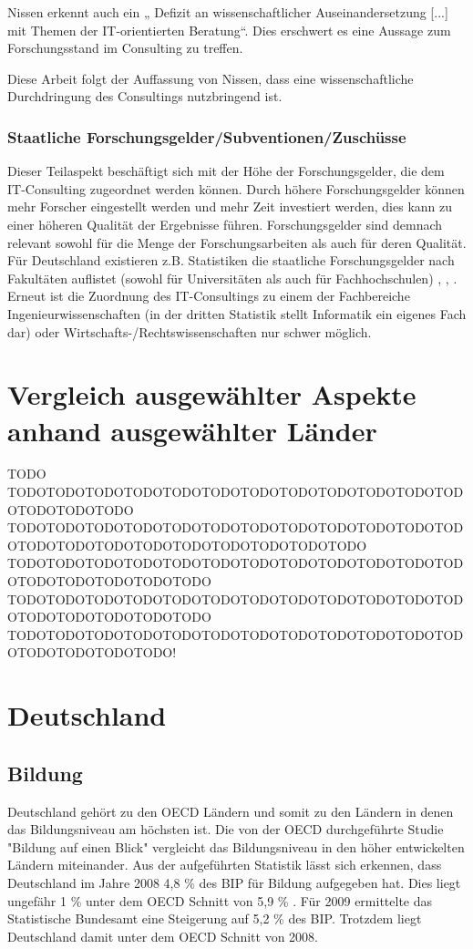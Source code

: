 Nissen erkennt auch ein „ Defizit an wissenschaftlicher Auseinandersetzung [...] mit Themen der IT-orientierten Beratung“. Dies erschwert es eine Aussage zum Forschungsstand im Consulting zu treffen.

Diese Arbeit folgt der Auffassung von Nissen, dass eine wissenschaftliche Durchdringung des Consultings nutzbringend ist.

\subsubsection*{Staatliche Forschungsgelder/Subventionen/Zuschüsse}
Dieser Teilaspekt beschäftigt sich mit der Höhe der Forschungsgelder, die dem IT-Consulting zugeordnet werden können. Durch höhere Forschungsgelder können mehr Forscher eingestellt werden und mehr Zeit investiert werden, dies kann zu einer höheren Qualität der Ergebnisse führen. Forschungsgelder sind demnach relevant sowohl für die Menge der Forschungsarbeiten als auch für deren Qualität.
Für Deutschland existieren z.B. Statistiken die staatliche Forschungsgelder nach Fakultäten auflistet (sowohl für Universitäten als auch für Fachhochschulen) \cite {ausgabenfakuni}, \cite {ausgabenfakfach}, \cite {ausgabenbmbf}. Erneut ist die Zuordnung des IT-Consultings zu einem der Fachbereiche Ingenieurwissenschaften (in der dritten Statistik stellt Informatik ein eigenes Fach dar) oder Wirtschafts-/Rechtswissenschaften nur schwer möglich.



\section{Vergleich ausgewählter Aspekte anhand ausgewählter Länder}
TODO TODOTODOTODOTODOTODOTODOTODOTODOTODOTODOTODOTODOTODOTODOTODO
TODOTODOTODOTODOTODOTODOTODOTODOTODOTODOTODOTODOTODOTODOTODOTODOTODOTODOTODOTODOTODO
TODOTODOTODOTODOTODOTODOTODOTODOTODOTODOTODOTODOTODOTODOTODOTODOTODO
TODOTODOTODOTODOTODOTODOTODOTODOTODOTODOTODOTODOTODOTODOTODOTODOTODO
TODOTODOTODOTODOTODOTODOTODOTODOTODOTODOTODOTODOTODOTODOTODOTODO!

\section{Deutschland}
\subsection{Bildung}
Deutschland gehört zu den OECD Ländern und somit zu den Ländern in denen das Bildungsniveau am höchsten ist. Die von der OECD durchgeführte Studie "Bildung auf einen Blick" \cite{oecd2} vergleicht das Bildungsniveau in den höher entwickelten Ländern miteinander. Aus der aufgeführten Statistik lässt sich erkennen, dass Deutschland im Jahre 2008 4,8 \% des BIP für Bildung aufgegeben hat. Dies liegt ungefähr 1 \% unter dem OECD Schnitt von 5,9 \% . Für 2009 ermittelte das Statistische Bundesamt eine Steigerung auf 5,2 \% des BIP. Trotzdem liegt Deutschland damit unter dem OECD Schnitt von 2008.

